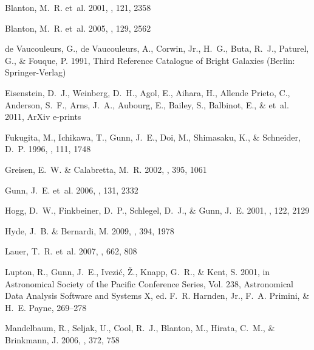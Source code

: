 \documentclass[10pt,preprint]{aastex}
\begin{document}
\begin{thebibliography}{31}
{Blanton}, M.~R. {et~al.} 2001, \aj, 121, 2358

{Blanton}, M.~R. {et~al.} 2005{}, \aj, 129, 2562

{de Vaucouleurs}, G., {de Vaucouleurs}, A., {Corwin}, Jr., H.~G., {Buta},
  R.~J., {Paturel}, G., \& {Fouque}, P. 1991, {Third Reference Catalogue of
  Bright Galaxies} (Berlin: Springer-Verlag)

{Eisenstein}, D.~J., {Weinberg}, D.~H., {Agol}, E., {Aihara}, H., {Allende
  Prieto}, C., {Anderson}, S.~F., {Arns}, J.~A., {Aubourg}, E., {Bailey}, S.,
  {Balbinot}, E., \& et~al. 2011, ArXiv e-prints

Fukugita, M., Ichikawa, T., Gunn, J.~E., Doi, M., Shimasaku, K., \& Schneider,
  D.~P. 1996, \aj, 111, 1748

{Greisen}, E.~W. \& {Calabretta}, M.~R. 2002, \aap, 395, 1061

{Gunn}, J.~E. {et~al.} 2006, \aj, 131, 2332

{Hogg}, D.~W., {Finkbeiner}, D.~P., {Schlegel}, D.~J., \& {Gunn}, J.~E. 2001,
  \aj, 122, 2129

{Hyde}, J.~B. \& {Bernardi}, M. 2009, \mnras, 394, 1978

{Lauer}, T.~R. {et~al.} 2007, \apj, 662, 808

{Lupton}, R., {Gunn}, J.~E., {Ivezi{\'c}}, {\v Z}., {Knapp}, G.~R., \& {Kent},
  S. 2001, in Astronomical Society of the Pacific Conference Series, Vol. 238,
  Astronomical Data Analysis Software and Systems X, ed. F.~R. {Harnden}, Jr.,
  F.~A. {Primini}, \& H.~E. {Payne}, 269--278

{Mandelbaum}, R., {Seljak}, U., {Cool}, R.~J., {Blanton}, M., {Hirata}, C.~M.,
  \& {Brinkmann}, J. 2006, \mnras, 372, 758


\end{thebibliography}
\end{document}
